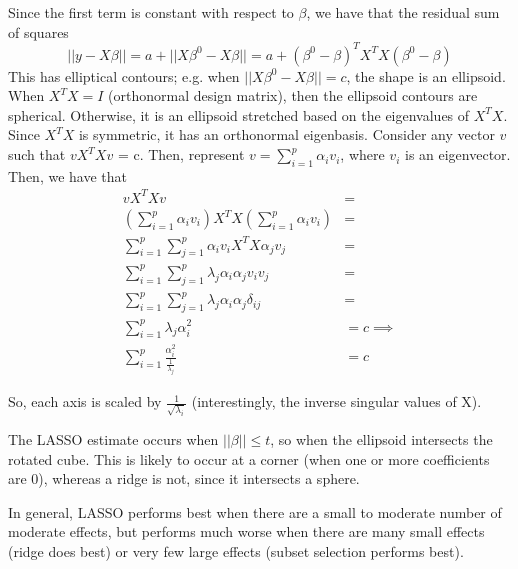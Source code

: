 \documentclass{article}
\newcommand{\image}[1]{\begin{minipage}[t]{\linewidth}
      \raggedright
      \adjustbox{valign=t}{
        \texttt{[image: \#1]}
      }
      \medskip
    \end{minipage}}
\begin{document}
Since the first term is constant with respect to $\beta$, we have that the residual sum of squares \[
||y - X\beta|| = a + ||X\beta^0 - X\beta|| = a + (\beta^0 - \beta)^TX^TX(\beta^0 - \beta)
\] This has elliptical contours; e.g. when $||X\beta^0 - X\beta|| = c$, the shape is an ellipsoid. When $X^TX = I$ (orthonormal design matrix), then the ellipsoid contours are spherical. Otherwise, it is an ellipsoid stretched based on the eigenvalues of $X^TX$. 
Since $X^TX$ is symmetric, it has an orthonormal eigenbasis. Consider any vector $v$ such that $vX^TXv$ = c. 
Then, represent $v = \sum_{i=1}^p \alpha_i v_i$, where $v_i$ is an eigenvector. Then, we have that \begin{align*}
    vX^TXv &= \\
    (\sum_{i=1}^p \alpha_i v_i)X^TX(\sum_{i=1}^p \alpha_i v_i) &= \\
    \sum_{i=1}^p \sum_{j=1}^p \alpha_i v_iX^TX \alpha_j v_j &= \\
    \sum_{i=1}^p \sum_{j=1}^p \lambda_j \alpha_i \alpha_j v_i v_j &= \\
    \sum_{i=1}^p \sum_{j=1}^p \lambda_j \alpha_i \alpha_j \delta_{ij} &= \\
    \sum_{i=1}^p \lambda_j \alpha_i^2 &= c \implies \\
    \sum_{i=1}^p \frac{\alpha_i^2}{\frac{1}{\lambda_j}} &= c
\end{align*}

So, each axis is scaled by $\frac{1}{\sqrt{\lambda_i}}$ (interestingly, the inverse singular values of X).

The LASSO estimate occurs when $||\beta|| \leq t$, so when the ellipsoid intersects the rotated cube. This is likely to occur at a corner (when one or more coefficients are 0), whereas a ridge is not, since it intersects a sphere.

In general, LASSO performs best when there are a small to moderate number of moderate effects, but performs much worse when there are many small effects (ridge does best) or very few large effects (subset selection performs best). 
\image{images/lasso_ellipse.png}
\end{document}
